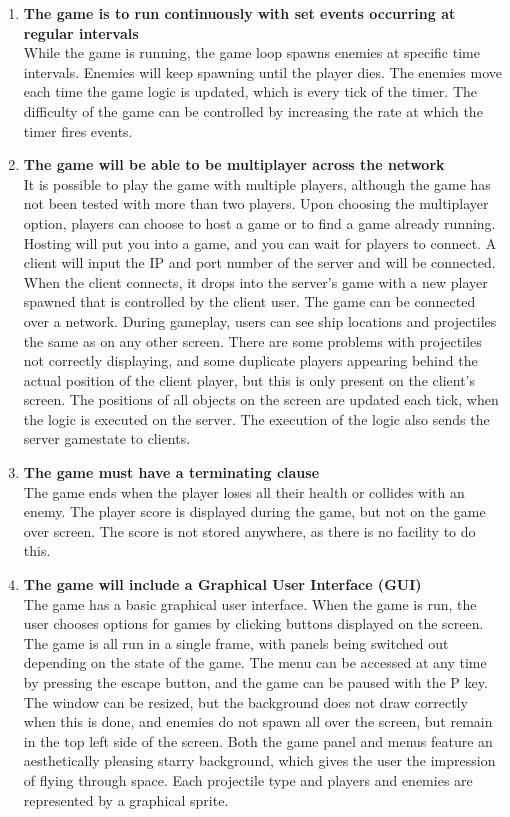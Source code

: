 \begin{enumerate}
\item \textbf{The game is to run continuously with set events occurring at regular intervals}\\
While the game is running, the game loop spawns enemies at specific time intervals. Enemies will keep spawning until the player dies. The enemies move each time the game logic is updated, which is every tick of the timer. The difficulty of the game can be controlled by increasing the rate at which the timer fires events.
\item \textbf{The game will be able to be multiplayer across the network}\\
It is possible to play the game with multiple players, although the game has not been tested with more than two players. Upon choosing the multiplayer option, players can choose to host a game or to find a game already running. Hosting will put you into a game, and you can wait for players to connect. A client will input the IP and port number of the server and will be connected. When the client connects, it drops into the server's game with a new player spawned that is controlled by the client user. The game can be connected over a network. During gameplay, users can see ship locations and projectiles the same as on any other screen. There are some problems with projectiles not correctly displaying, and some duplicate players appearing behind the actual position of the client player, but this is only present on the client's screen. The positions of all objects on the screen are updated each tick, when the logic is executed on the server. The execution of the logic also sends the server gamestate to clients.
\item \textbf{The game must have a terminating clause}\\
The game ends when the player loses all their health or collides with an enemy. The player score is displayed during the game, but not on the game over screen. The score is not stored anywhere, as there is no facility to do this.
\item \textbf{The game will include a Graphical User Interface (GUI)}\\
The game has a basic graphical user interface. When the game is run, the user chooses options for games by clicking buttons displayed on the screen. The game is all run in a single frame, with panels being switched out depending on the state of the game. The menu can be accessed at any time by pressing the escape button, and the game can be paused with the P key. The window can be resized, but the background does not draw correctly when this is done, and enemies do not spawn all over the screen, but remain in the top left side of the screen. Both the game panel and menus feature an aesthetically pleasing starry background, which gives the user the impression of flying through space. Each projectile type and players and enemies are represented by a graphical sprite.
\end{enumerate}
